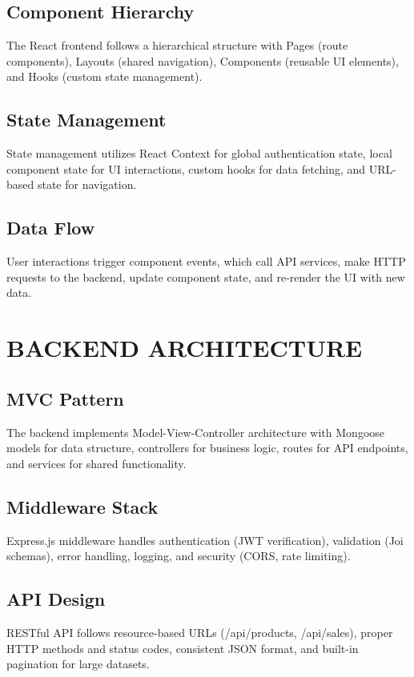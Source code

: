 \subsection{Component Hierarchy}
The React frontend follows a hierarchical structure with Pages (route components), Layouts (shared navigation), Components (reusable UI elements), and Hooks (custom state management).

\subsection{State Management}
State management utilizes React Context for global authentication state, local component state for UI interactions, custom hooks for data fetching, and URL-based state for navigation.

\subsection{Data Flow}
User interactions trigger component events, which call API services, make HTTP requests to the backend, update component state, and re-render the UI with new data.

\section{BACKEND ARCHITECTURE}

\subsection{MVC Pattern}
The backend implements Model-View-Controller architecture with Mongoose models for data structure, controllers for business logic, routes for API endpoints, and services for shared functionality.

\subsection{Middleware Stack}
Express.js middleware handles authentication (JWT verification), validation (Joi schemas), error handling, logging, and security (CORS, rate limiting).

\subsection{API Design}
RESTful API follows resource-based URLs (/api/products, /api/sales), proper HTTP methods and status codes, consistent JSON format, and built-in pagination for large datasets.

